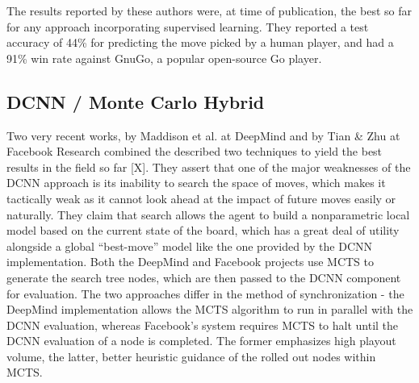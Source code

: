 The results reported by these authors were, at time of publication, the best so far for any approach incorporating supervised learning. They reported a test accuracy of 44\% for predicting the move picked by a human player, and had a 91\% win rate against GnuGo, a popular open-source Go player. 

\subsection*{DCNN / Monte Carlo Hybrid}

Two very recent works, by Maddison et al. at DeepMind and by Tian \& Zhu at Facebook Research combined the described two techniques to yield the best results in the field so far [X]. They assert that one of the major weaknesses of the DCNN approach is its inability to search the space of moves, which makes it tactically weak as it cannot look ahead at the impact of future moves easily or naturally. They claim that search allows the agent to build a nonparametric local model based on the current state of the board, which has a great deal of utility alongside a global ``best-move'' model like the one provided by the DCNN implementation. Both the DeepMind and Facebook projects use MCTS to generate the search tree nodes, which are then passed to the DCNN component for evaluation. The two approaches differ in the method of synchronization - the DeepMind implementation allows the MCTS algorithm to run in parallel with the DCNN evaluation, whereas Facebook's system requires MCTS to halt until the DCNN evaluation of a node is completed. The former emphasizes high playout volume, the latter, better heuristic guidance of the rolled out nodes within MCTS. 
